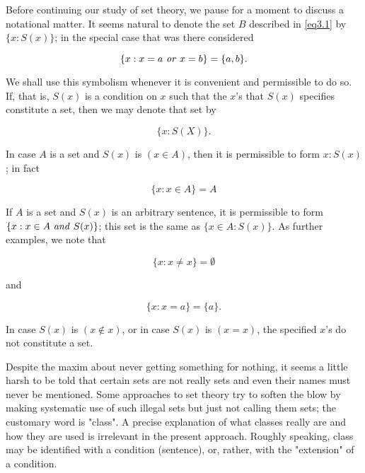 Before continuing our study of set theory, we pause for a moment to discuss a notational matter. It seems natural to denote the set $B$ described in \eqref{eq3.1} by $\{x: S(x)\}$; in the special case that was there considered

\begin{equation*}
\{ x : x = a \text{ \textit{or} } x = b \} = \{ a,b \}.
\end{equation*}

We shall use this symbolism whenever it is convenient and permissible to do so. If, that is, $S(x)$ is a condition on $x$ such that the $x$'s that $S(x)$ specifies constitute a set, then we may denote that set by 

\begin{equation*}
\{ x : S(X) \}.
\end{equation*}

In case $A$ is a set and $S(x)$ is $(x \in A)$, then it is permissible to form ${x: S(x)}$; in fact 

\begin{equation*}
\{ x : x \in A \} = A
\end{equation*}

If $A$ is a set and $S(x)$ is an arbitrary sentence, it is permissible to form $ \{ x : x \in A \text{ \textit{and} } S(x) \}$; this set is the same as $\{x \in A: S(x) \}$. As further examples, we note that 

\begin{equation*}
\{ x : x \neq x \} = \emptyset
\end{equation*}

and

\begin{equation*}
\{ x : x = a \} = \{ a \}.
\end{equation*}

In case $S(x)$ is $(x \notin x)$, or in case $S(x)$ is $(x = x)$, the specified $x$'s do not constitute a set. 

Despite the maxim about never getting something for nothing, it seems a little harsh to be told that certain sets are not really sets and even their names must never be mentioned. Some approaches to set theory try to soften the blow by making systematic use of such illegal sets but just not calling them sets; the customary word is "class". A precise explanation of what classes really are and how they are used is irrelevant in the present approach. Roughly speaking, class may be identified with a condition (sentence), or, rather, with the "extension" of a condition.